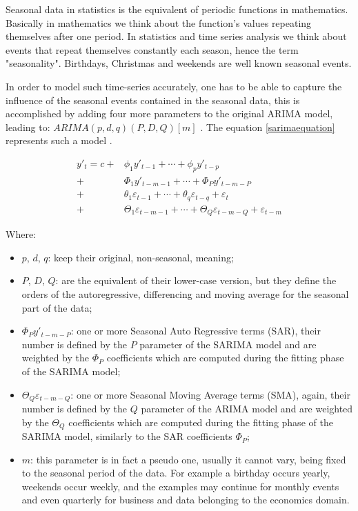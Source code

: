 \documentclass[12pt,a4paper,titlepage]{report}
\begin{document}
Seasonal data in statistics is the equivalent of periodic functions in mathematics. Basically in mathematics we think about the function's values repeating themselves after one period. In statistics and time series analysis we think about events that repeat themselves constantly each season, hence the term "seasonality". Birthdays, Christmas and weekends are well known seasonal events.

In order to model such time-series accurately, one has to be able to capture the influence of the seasonal events contained in the seasonal data, this is accomplished by adding four more parameters to the original ARIMA model, leading to: $ ARIMA(p, d, q)(P, D, Q)[m] $ \cite{fpp2seasonalarima}. The equation \ref{sarimaequation} represents such a model \cite{automatictimeseriesforecasting}.

\begin{equation}
\label{sarimaequation}
\begin{split}
y'_{t} = c + & \phi_{1}y'_{t-1} + \cdots + \phi_{p}y'_{t-p} \\
           + & \Phi_{1}y'_{t-m-1} + \cdots + \Phi_{P}y'_{t-m-P} \\
           + & \theta_{1}\varepsilon_{t-1} + \cdots + \theta_{q}\varepsilon_{t-q} + \varepsilon_{t} \\
           + & \Theta_{1}\varepsilon_{t-m-1} + \cdots + \Theta_{Q}\varepsilon_{t-m-Q} + \varepsilon_{t-m}
\end{split}
\end{equation}

Where:

\begin{itemize}
    \item $ p $, $ d $, $ q $: keep their original, non-seasonal, meaning;
    \item $ P $, $ D $, $ Q $: are the equivalent of their lower-case version, but they define the orders of the autoregressive, differencing and moving average for the seasonal part of the data;
    \item $ \Phi_{P}y'_{t-m-P} $: one or more Seasonal Auto Regressive terms (SAR), their number is defined by the $ P $ parameter of the SARIMA model and are weighted by the $ \Phi_{P} $ coefficients which are computed during the fitting phase of the SARIMA model;
    \item $ \Theta_{Q}\varepsilon_{t-m-Q} $: one or more Seasonal Moving Average terms (SMA), again, their number is defined by the $ Q $ parameter of the ARIMA model and are weighted by the $ \Theta_{Q} $ coefficients which are computed during the fitting phase of the SARIMA model, similarly to the SAR coefficients $ \Phi_{P} $;
    \item $ m $: this parameter is in fact a pseudo one, usually it cannot vary, being fixed to the seasonal period of the data. For example a birthday occurs yearly, weekends occur weekly, and the examples may continue for monthly events and even quarterly for business and data belonging to the economics domain.
\end{itemize}
\end{document}
